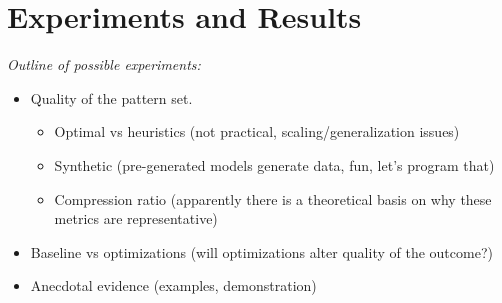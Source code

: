 \documentclass[a4paper,notoc,oneside]{tufte-book}
\begin{document}
\chapter{Experiments and Results}

\emph{Outline of possible experiments:}
\begin{itemize}
\item Quality of the pattern set.
\begin{itemize}
\item Optimal vs heuristics (not practical, scaling/generalization issues)
\item Synthetic (pre-generated models generate data, fun, let's program that)
\item Compression ratio (apparently there is a theoretical basis on why these metrics are representative)
\end{itemize}
\item Baseline vs optimizations (will optimizations alter quality of the outcome?)
\item Anecdotal evidence (examples, demonstration)
\end{itemize}
\end{document}
